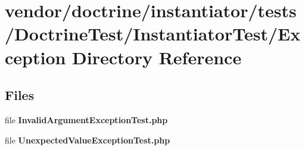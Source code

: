 \section{vendor/doctrine/instantiator/tests/\+Doctrine\+Test/\+Instantiator\+Test/\+Exception Directory Reference}
\label{dir_476242f86ac934d4cfb2891d52722455}
\subsection*{Files}
\begin{DoxyCompactItemize}
\item 
file {\bf Invalid\+Argument\+Exception\+Test.\+php}
\item 
file {\bf Unexpected\+Value\+Exception\+Test.\+php}
\end{DoxyCompactItemize}
